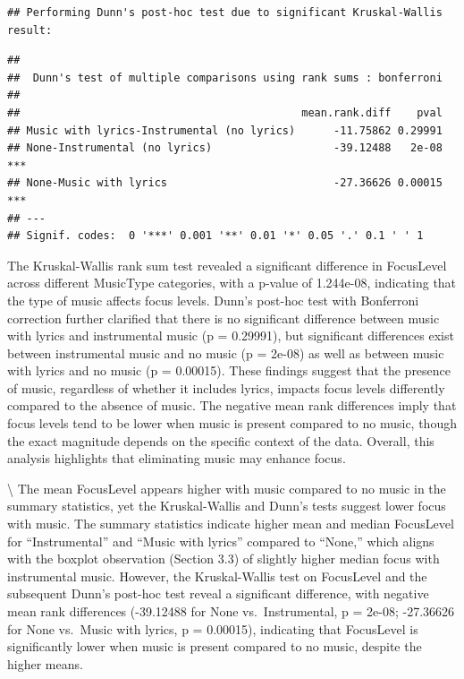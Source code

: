 \documentclass[
]{article}
\begin{document}
\begin{verbatim}
## Performing Dunn's post-hoc test due to significant Kruskal-Wallis result:
\end{verbatim}

\begin{verbatim}
## 
##  Dunn's test of multiple comparisons using rank sums : bonferroni  
## 
##                                            mean.rank.diff    pval    
## Music with lyrics-Instrumental (no lyrics)      -11.75862 0.29991    
## None-Instrumental (no lyrics)                   -39.12488   2e-08 ***
## None-Music with lyrics                          -27.36626 0.00015 ***
## ---
## Signif. codes:  0 '***' 0.001 '**' 0.01 '*' 0.05 '.' 0.1 ' ' 1
\end{verbatim}

The Kruskal-Wallis rank sum test revealed a significant difference in
FocusLevel across different MusicType categories, with a p-value of
1.244e-08, indicating that the type of music affects focus levels.
Dunn's post-hoc test with Bonferroni correction further clarified that
there is no significant difference between music with lyrics and
instrumental music (p = 0.29991), but significant differences exist
between instrumental music and no music (p = 2e-08) as well as between
music with lyrics and no music (p = 0.00015). These findings suggest
that the presence of music, regardless of whether it includes lyrics,
impacts focus levels differently compared to the absence of music. The
negative mean rank differences imply that focus levels tend to be lower
when music is present compared to no music, though the exact magnitude
depends on the specific context of the data. Overall, this analysis
highlights that eliminating music may enhance focus.

\textbackslash{} The mean FocusLevel appears higher with music compared
to no music in the summary statistics, yet the Kruskal-Wallis and Dunn's
tests suggest lower focus with music. The summary statistics indicate
higher mean and median FocusLevel for ``Instrumental'' and ``Music with
lyrics'' compared to ``None,'' which aligns with the boxplot observation
(Section 3.3) of slightly higher median focus with instrumental music.
However, the Kruskal-Wallis test on FocusLevel and the subsequent Dunn's
post-hoc test reveal a significant difference, with negative mean rank
differences (-39.12488 for None vs.~Instrumental, p = 2e-08; -27.36626
for None vs.~Music with lyrics, p = 0.00015), indicating that FocusLevel
is significantly lower when music is present compared to no music,
despite the higher means.
\end{document}
